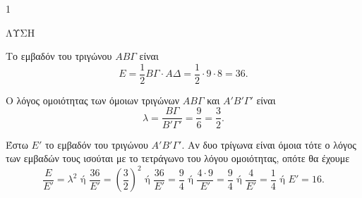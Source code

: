 \begin{ylh}{1}
    \item [Ύλη από εικόνα]
\end{ylh}
ΛΥΣΗ

\begin{alist}
    \item [α)] Το εμβαδόν του τριγώνου $AB\Gamma$ είναι
    \[ E = \frac{1}{2} B\Gamma \cdot A\Delta = \frac{1}{2} \cdot 9 \cdot 8 = 36. \]
    \item [β)]
    \begin{rlist}
        \item [i)] Ο λόγος ομοιότητας των όμοιων τριγώνων $AB\Gamma$ και $A'B'\Gamma'$ είναι
        \[ \lambda = \frac{B\Gamma}{B'\Gamma'} = \frac{9}{6} = \frac{3}{2}. \]
        \item [ii)] Έστω $E'$ το εμβαδόν του τριγώνου $A'B'\Gamma'$. Αν δυο τρίγωνα είναι όμοια τότε ο λόγος των εμβαδών τους ισούται με το τετράγωνο του λόγου ομοιότητας, οπότε θα έχουμε
        \[ \frac{E}{E'} = \lambda^2 \text{ ή } \frac{36}{E'} = \left(\frac{3}{2}\right)^2 \text{ ή } \frac{36}{E'} = \frac{9}{4} \text{ ή } \frac{4 \cdot 9}{E'} = \frac{9}{4} \text{ ή } \frac{4}{E'} = \frac{1}{4} \text{ ή } E' = 16. \]
    \end{rlist}
\end{alist}